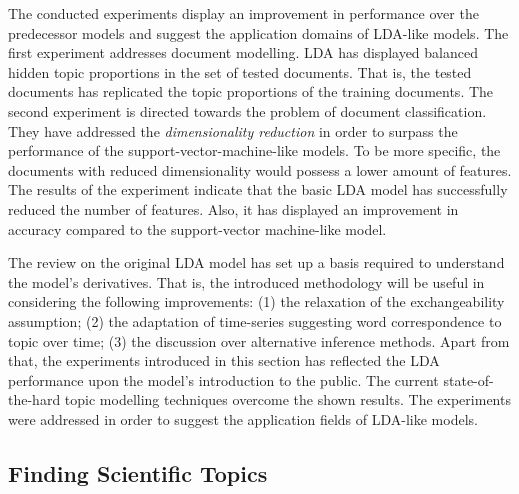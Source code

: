 \documentclass{mprop}
\begin{document}
\par The conducted experiments display an improvement in performance over the predecessor models and suggest the application domains of LDA-like models. The first experiment addresses document modelling. LDA  has displayed balanced hidden topic proportions in the set of tested documents. That is, the tested documents has replicated the topic proportions of the training documents. The second experiment is directed towards the problem of document classification. They have addressed the \textit{dimensionality reduction} in order to surpass the performance of the support-vector-machine-like models. To be more specific, the documents with reduced dimensionality would possess a lower amount of features. The results of the experiment indicate that the basic LDA model has successfully reduced the number of features. Also, it has displayed an improvement in accuracy compared to the support-vector machine-like model. 

\par The review on the original LDA model has set up a basis required to understand the model's derivatives. That is, the introduced methodology will be useful in considering the following improvements: (1) the  relaxation of the exchangeability assumption; (2) the adaptation of time-series suggesting word correspondence to topic over time; (3) the discussion over alternative inference methods. Apart from that, the experiments introduced in this section has reflected the LDA performance upon the model's introduction to the public. The current state-of-the-hard topic modelling techniques overcome the shown results. The experiments were addressed in order to suggest the application fields of LDA-like models.

\subsection{Finding Scientific Topics}
\end{document}
